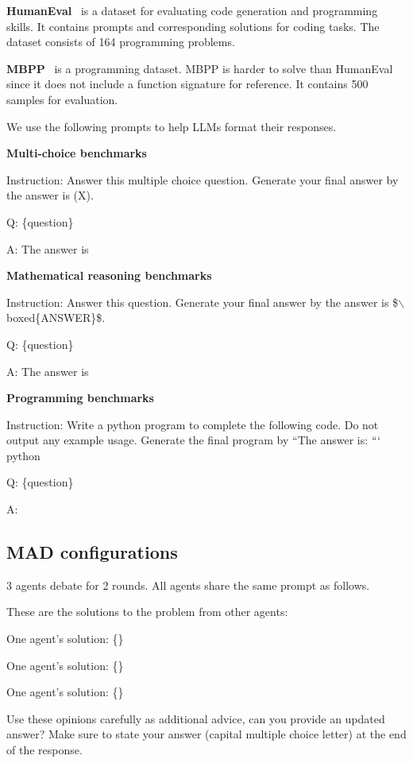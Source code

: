 \noindent\textbf{HumanEval}~\citep{humaneval} is a dataset for evaluating code generation and programming skills. It contains prompts and corresponding solutions for coding tasks. The dataset consists of 164 programming problems.

\noindent\textbf{MBPP}~\citep{mbpp} is a programming dataset. MBPP is harder to solve than HumanEval since it does not include a function signature for reference. It contains 500 samples for evaluation.

We use the following prompts to help LLMs format their responses.
\begin{tcolorbox}[colback=gray!10!white, colframe=black!70!white, breakable]
\textbf{Multi-choice benchmarks}

Instruction: Answer this multiple choice question. Generate your final answer by the answer is (X).

Q: \{question\}

A: The answer is 


\textbf{Mathematical reasoning benchmarks}

Instruction: Answer this question. Generate your final answer by the answer is \$$\backslash$boxed\{ANSWER\}\$.

Q: \{question\}
    
A: The answer is 


\textbf{Programming benchmarks}

Instruction: Write a python program to complete the following code. Do not output any example usage. Generate the final program by ``The answer is: $```$python

Q: \{question\}

A: 

\end{tcolorbox}



\subsection{MAD configurations} \label{appendix:mad_conf}


 3 agents debate for 2 rounds. All agents share the same prompt as follows.

\begin{tcolorbox}[colback=gray!10!white, colframe=black!70!white, breakable]

These are the solutions to the problem from other agents: 

One agent's solution: \{\}

One agent's solution: \{\}

One agent's solution: \{\}

Use these opinions carefully as additional advice, can you provide an updated answer? Make sure to state your answer (capital multiple choice letter) at the end of the response.

\end{tcolorbox}

